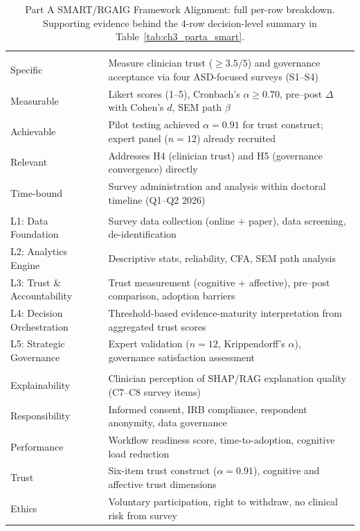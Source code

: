 {
\begin{xltabular}{\textwidth}{@{} >{\raggedright\arraybackslash}p{2.0cm} L @{}}
\caption[Part A SMART/RGAIG Alignment: Full Per-Row Breakdown]{Part A SMART/RGAIG Framework Alignment: full per-row breakdown. Supporting evidence behind the 4-row decision-level summary in Table~\ref{tab:ch3_parta_smart}.}\label{tab:appc_parta_smart_full} \\
\toprule
{} &  \\
\midrule
\endfirsthead
\endhead
\bottomrule
\endlastfoot
{} \\
\addlinespace
Specific & Measure clinician trust ($\geq 3.5/5$) and governance acceptance via four ASD-focused surveys (S1--S4) \\
Measurable & Likert scores (1--5), Cronbach's $\alpha \geq 0.70$, pre--post $\Delta$ with Cohen's $d$, SEM path $\beta$ \\
Achievable & Pilot testing achieved $\alpha = 0.91$ for trust construct; expert panel ($n = 12$) already recruited \\
Relevant & Addresses H4 (clinician trust) and H5 (governance convergence) directly \\
Time-bound & Survey administration and analysis within doctoral timeline (Q1--Q2 2026) \\
\midrule
{} \\
\addlinespace
L1: Data Foundation & Survey data collection (online + paper), data screening, de-identification \\
L2: Analytics Engine & Descriptive stats, reliability, CFA, SEM path analysis \\
L3: Trust \& Accountability & Trust measurement (cognitive + affective), pre--post comparison, adoption barriers \\
L4: Decision Orchestration & Threshold-based evidence-maturity interpretation from aggregated trust scores \\
L5: Strategic Governance & Expert validation ($n = 12$, Krippendorff's $\alpha$), governance satisfaction assessment \\
\midrule
{} \\
\addlinespace
Explainability & Clinician perception of SHAP/RAG explanation quality (C7--C8 survey items) \\
Responsibility & Informed consent, IRB compliance, respondent anonymity, data governance \\
Performance & Workflow readiness score, time-to-adoption, cognitive load reduction \\
Trust & Six-item trust construct ($\alpha = 0.91$), cognitive and affective trust dimensions \\
Ethics & Voluntary participation, right to withdraw, no clinical risk from survey \\
\end{xltabular}}
